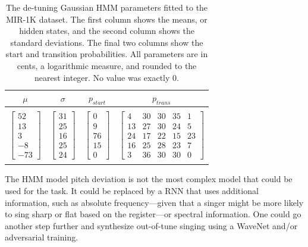 \begin{table}[t]
  \begin{center}
    \begin{tabular}{|c|c|c|c|}
    \hline
      $\mu$ & $\sigma$ & $p_{start}$ & $p_{trans}$ \\
      \hline
      &&& \\
      $\left[ \begin{array}{c} 52 \\  13 \\3\\-8\\-73 \end{array}\right]$
      & $\left[ \begin{array}{c} 31  \\ 25\\16\\25\\24 \end{array}\right]$
      & $\left[ \begin{array}{c} 0  \\ 9\\76\\15\\0 \end{array}\right]$
      & $\left[ \begin{array}{ccccc} 4 & 30 & 30 & 35 & 1  \\ 13&27&30&24&5\\24&17&22&15&23\\16&25&28&23&7\\3&36&30&30&0 \end{array}\right]$  \\
      &&& \\
      \hline
    \end{tabular}
    \label{tab:detuning-hmm}
    \caption{The de-tuning Gaussian HMM parameters fitted to the MIR-1K dataset. The first column shows the means, or hidden states, and the second column shows the standard deviations. The final two columns show the start and transition probabilities. All parameters are in cents, a logarithmic measure, and rounded to the nearest integer. No value was exactly 0.}
  \end{center}
\end{table}

The HMM model pitch deviation is not the most complex model that could be used for the task. It could be replaced by a RNN that uses additional information, such as absolute frequency---given that a singer might be more likely to sing sharp or flat based on the register---or spectral information. One could go another step further and synthesize out-of-tune singing using a WaveNet and/or adversarial training.

